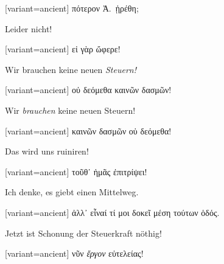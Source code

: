 \switchcolumn

\begin{greek}[variant=ancient]%
πότερον Ἀ.\ ᾑρέθη;

\end{greek}%
\switchcolumn*

Leider nicht!

\switchcolumn

\begin{greek}[variant=ancient]%
εἰ γὰρ ὤφερε!

\end{greek}%
Wir brauchen keine neuen \emph{Steuern!} 

\switchcolumn

\begin{greek}[variant=ancient]%
οὐ δεόμεθα καινῶν δασμῶν!

\end{greek}%
\switchcolumn*

Wir \emph{brauchen} keine neuen Steuern! 

\switchcolumn

\begin{greek}[variant=ancient]%
καινῶν δασμῶν οὐ δεόμεθα!

\end{greek}%
\switchcolumn*

Das wird uns ruiniren!

\switchcolumn

\begin{greek}[variant=ancient]%
τοῦθ᾽ ἡμᾶς ἐπιτρίψει!

\end{greek}%
\switchcolumn*

Ich denke, es giebt einen Mittelweg.

\switchcolumn

\begin{greek}[variant=ancient]%
ἀλλ᾽ εἶναί τί μοι δοκεῖ μέση τούτων ὁδός.

\end{greek}%
\switchcolumn*

Jetzt ist Schonung der Steuerkraft nöthig!

\switchcolumn

\begin{greek}[variant=ancient]%
νῦν \emph{ἔργον} εὐτελείας!

\end{greek}%
\switchcolumn*

